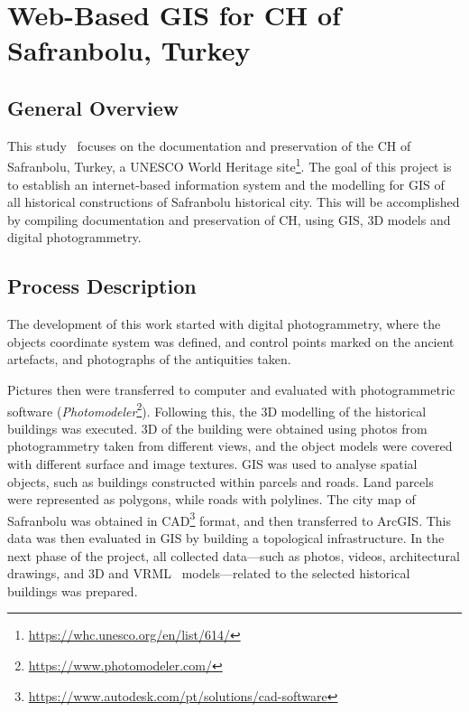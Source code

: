 \section{Web-Based \gls{GIS} for \gls{CH} of Safranbolu, Turkey} 
\label{sec:gis_safranbolu}

\subsection*{General Overview}

This study~\cite{arca2018development} focuses on the documentation and preservation of the \gls{CH} of Safranbolu, Turkey, a UNESCO World Heritage site\footnote{\url{https://whc.unesco.org/en/list/614/}}. 
The goal of this project is to establish an internet-based information system and the modelling for GIS of all historical constructions of Safranbolu historical city.
This will be accomplished by compiling documentation and preservation of \gls{CH}, using \gls{GIS}, \gls{3D} models and digital photogrammetry.

\subsection*{Process Description}

The development of this work started with digital photogrammetry, where the objects coordinate system was defined, and control points marked on the ancient artefacts, and photographs of the antiquities taken.

Pictures then were transferred to computer and evaluated with photogrammetric software (\textit{Photomodeler}\footnote{\url{https://www.photomodeler.com/}}). Following this, the \gls{3D} modelling of the historical buildings was executed.
\gls{3D} of the building were obtained using photos from photogrammetry taken from different views, and the object models were covered with different surface and image textures.
\gls{GIS} was used to analyse spatial objects, such as buildings constructed within parcels and roads. Land parcels were represented as polygons, while roads with polylines.
The city map of Safranbolu was obtained in \gls{CAD}\footnote{\url{https://www.autodesk.com/pt/solutions/cad-software}} format, and then transferred to ArcGIS. This data was then evaluated in \gls{GIS} by building a topological infrastructure.
In the next phase of the project, all collected data—such as photos, videos, architectural drawings, and \gls{3D} and \gls{VRML}~\cite{713310} models—related to the selected historical buildings was prepared. 

